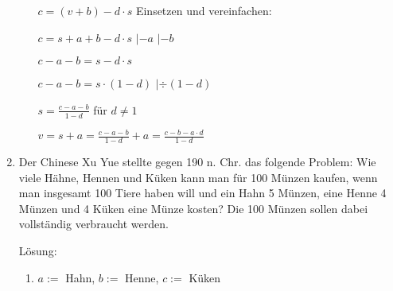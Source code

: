 \documentclass[../main.tex]{subfiles}
\begin{document}
\begin{enumerate}
\begin{enumerate}
		            \begin{math}
			            c = (v + b) - d \cdot s
		            \end{math}
		            Einsetzen und vereinfachen:

		            \begin{math}
			            c = s + a + b - d \cdot s
		            \end{math}
		            \(|\)\begin{math}
			            - a
		            \end{math}
		            \(|\)\begin{math}
			            - b
		            \end{math}

		            \begin{math}
			            c - a - b = s - d \cdot s
		            \end{math}

		            \begin{math}
			            c - a - b = s \cdot (1 - d)
		            \end{math}
		            \(|\)\begin{math}
			            \div (1-d)
		            \end{math}

		            \begin{math}
			            s = \frac{c - a - b}{1-d}
		            \end{math} für \begin{math}
			            d \neq 1
		            \end{math}

		            \begin{math}
			            v = s + a = \frac{c - a - b}{1-d} + a = \frac{c - b - a \cdot d}{1 - d}
		            \end{math}
	      \end{enumerate}
	\item Der Chinese Xu Yue stellte gegen 190 n. Chr. das folgende Problem:
	      Wie viele Hähne, Hennen und Küken kann man für 100 Münzen kaufen,
	      wenn man insgesamt 100 Tiere haben will und ein Hahn 5 Münzen,
	      eine Henne 4 Münzen und 4 Küken eine Münze kosten?
	      Die 100 Münzen sollen dabei vollständig verbraucht werden.

	      Lösung:
	      \begin{enumerate}
			  \item 
			 \begin{math}
				 a := 
			 \end{math} Hahn, 
			 \begin{math}
				 b := 
			 \end{math} Henne,
			 \begin{math}
				 c := 
			 \end{math} Küken


\end{enumerate}
\end{enumerate}
\end{document}
